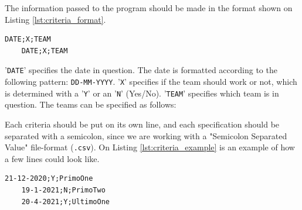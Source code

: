 The information passed to the program should be made in the format shown on Listing \ref{lst:criteria_format}.
\begin{lstlisting}[caption={Format of Criteria}, label={lst:criteria_format}]
    DATE;X;TEAM
    DATE;X;TEAM
\end{lstlisting}
'\verb|DATE|' specifies the date in question. The date is formatted according to the following pattern: \verb|DD-MM-YYYY|. '\verb|X|' specifies if the team should work or not, which is determined with a '\verb|Y|' or an '\verb|N|' (Yes/No). '\verb|TEAM|' specifies which team is in question. The teams can be specified as follows:
\begin{itemize}
\end{itemize}
Each criteria should be put on its own line, and each specification should be separated with a semicolon, since we are working with a "Semicolon Separated Value" file-format (\verb|.csv|). On Listing \ref{lst:criteria_example} is an example of how a few lines could look like.
\begin{lstlisting}[caption={Example of criteria file}, label={lst:criteria_example}]
    21-12-2020;Y;PrimoOne
    19-1-2021;N;PrimoTwo
    20-4-2021;Y;UltimoOne
\end{lstlisting}


